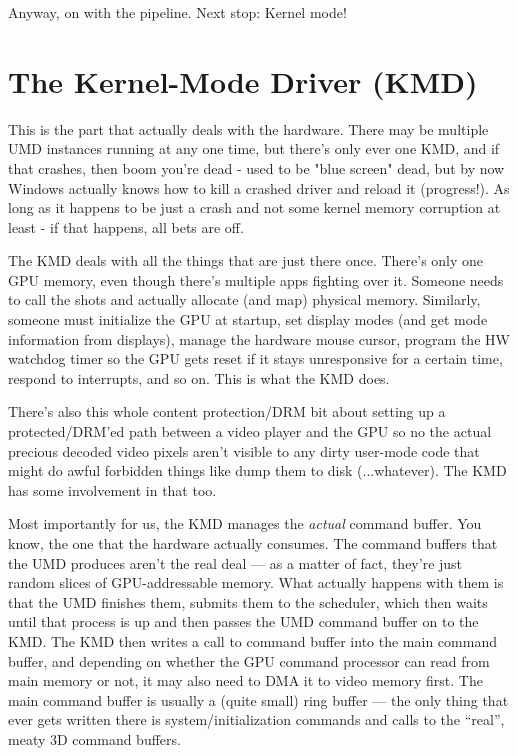 Anyway, on with the pipeline. Next stop: Kernel mode!
 
\section{The Kernel-Mode Driver (KMD)}

This is the part that actually deals with the hardware. There may be multiple
UMD instances running at any one time, but there's only ever one KMD, and if
that crashes, then boom you're dead - used to be "blue screen" dead, but by now
Windows actually knows how to kill a crashed driver and reload it (progress!).
As long as it happens to be just a crash and not some kernel memory corruption
at least - if that happens, all bets are off.

The KMD deals with all the things that are just there once. There's only one
GPU memory, even though there's multiple apps fighting over it. Someone needs
to call the shots and actually allocate (and map) physical memory. Similarly,
someone must initialize the GPU at startup, set display modes (and get mode
information from displays), manage the hardware mouse cursor, program the HW
watchdog timer so the GPU gets reset if it stays unresponsive for a certain
time, respond to interrupts, and so on. This is what the KMD does.

There's also this whole content protection/DRM bit about setting up a
protected/DRM'ed path between a video player and the GPU so no the actual
precious decoded video pixels aren't visible to any dirty user-mode code that
might do awful forbidden things like dump them to disk (...whatever). The KMD
has some involvement in that too.

Most importantly for us, the KMD manages the \emph{actual} command buffer.  You
know, the one that the hardware actually consumes. The command buffers that the
UMD produces aren't the real deal --- as a matter of fact, they're just random
slices of GPU-addressable memory. What actually happens with them is that the
UMD finishes them, submits them to the scheduler, which then waits until that
process is up and then passes the UMD command buffer on to the KMD.  The KMD
then writes a call to command buffer into the main command buffer, and
depending on whether the GPU command processor can read from main memory or
not, it may also need to DMA it to video memory first. The main command buffer
is usually a (quite small) ring buffer --- the only thing that ever gets
written there is system/initialization commands and calls to the ``real'',
meaty 3D command buffers.

